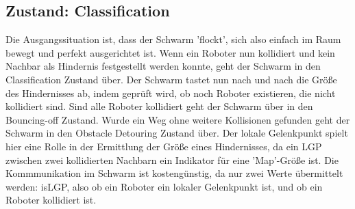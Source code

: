\subsection{Zustand: Classification}

Die Ausgangssituation ist, dass der Schwarm 'flockt', sich also einfach im Raum bewegt und perfekt
ausgerichtet ist.
Wenn ein Roboter nun kollidiert und kein Nachbar als Hindernis festgestellt werden konnte, geht der
Schwarm in den Classification Zustand über. Der Schwarm tastet nun nach und nach die Größe des Hindernisses
ab, indem geprüft wird, ob noch Roboter existieren, die nicht kollidiert sind. Sind alle Roboter kollidiert
geht der Schwarm über in den Bouncing-off Zustand. Wurde ein Weg ohne weitere Kollisionen gefunden geht
der Schwarm in den Obstacle Detouring Zustand über. Der lokale Gelenkpunkt spielt hier eine Rolle in der
Ermittlung der Größe eines Hindernisses, da ein LGP zwischen zwei kollidierten Nachbarn ein Indikator für
eine 'Map'-Größe ist. Die Kommmunikation im Schwarm ist kostengünstig, da nur zwei Werte übermittelt werden:
isLGP, also ob ein Roboter ein lokaler Gelenkpunkt ist, und ob ein Roboter kollidiert ist.
